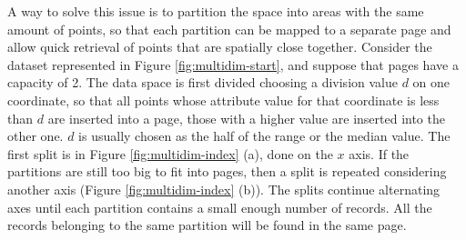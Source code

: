 A way to solve this issue is to partition the space into areas with the same amount of points, so that each partition can be mapped to a separate page and allow quick retrieval of points that are spatially close together. Consider the dataset represented in Figure \ref{fig:multidim-start}, and suppose that pages have a capacity of 2. The data space is first divided choosing a division value $d$ on one coordinate, so that all points whose attribute value for that coordinate is less than $d$ are inserted into a page, those with a higher value are inserted into the other one. $d$ is usually chosen as the half of the range or the median value. The first split is in Figure \ref{fig:multidim-index} (a), done on the $x$ axis. If the partitions are still too big to fit into pages, then a split is repeated considering another axis (Figure \ref{fig:multidim-index} (b)). The splits continue alternating axes until each partition contains a small enough number of records. All the records belonging to the same partition will be found in the same page.

